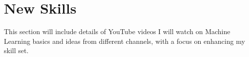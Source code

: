 \chapter{New Skills}
\label{chap:skills-related}


This section will include details of YouTube videos I will watch on Machine Learning basics and ideas from different channels, with a focus on enhancing my skill set. 

% 
